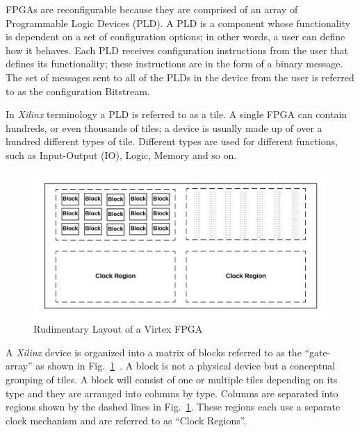 \documentclass[journal, hidelinks]{IEEEtran}
\begin{document}
FPGAs are reconfigurable because they are comprised of an array of Programmable Logic Devices (PLD).
A PLD is a component whose functionality is dependent on a set of configuration options; in other words, a user can define how it behaves.
Each PLD receives configuration instructions from the user that defines its functionality; these instructions are in the form of a binary message.
The set of messages sent to all of the PLDs in the device from the user is referred to as the configuration Bitstream.

In \textit{Xilinx} terminology a PLD is referred to as a tile. 
A single FPGA can contain hundreds, or even thousands of tiles; a device is usually made up of over a hundred different types of tile.
Different types are used for different functions, such as Input-Output (IO), Logic, Memory and so on.
\begin{figure}[h]
	\centering
	\includegraphics[width=1\linewidth]{Figures/FPGA}
	\caption[Rudimentary Layout of a Virtex FPGA]{Rudimentary Layout of a Virtex FPGA}
	\label{fig:FPGA}
\end{figure}
A \textit{Xilinx} device is organized into a matrix of blocks referred to as the ``gate-array'' as shown in Fig.~\ref{fig:FPGA}~\cite{xilnxDevManual}.
A block is not a physical device but a conceptual grouping of tiles.
A block will consist of one or multiple tiles depending on its type and they are arranged into columns by type.
Columns are separated into regions shown by the dashed lines in Fig.~\ref{fig:FPGA}.
These regions each use a separate clock mechanism and are referred to as ``Clock Regions''.

\end{document}
